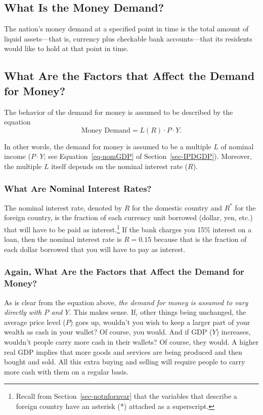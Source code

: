 \documentclass[
  letterpaper,
]{book}
\theoremstyle{plain}
\theoremstyle{remark}
\begin{document}
\subsection{What Is the Money Demand?}\label{sec-mdemand}

The nation's money demand  at a specified point
in time is the total amount of liquid assets---that is, currency plus
checkable bank accounts---that its residents would like to hold at that
point in time.

\subsection{What Are the Factors that Affect the Demand for
Money?}\label{sec-mdemanddet}

The behavior of the demand for money is assumed to be described by the
equation \[
\text{Money Demand}=L(R)\cdot P\cdot Y.
\]

In other words, the demand for money is assumed to be a multiple \(L\)
of nominal income (\(P\cdot Y\); see Equation~\ref{eq-nomGDP} of
Section~\ref{sec-IPDGDP}). Moreover, the multiple \(L\) itself depends
on the nominal interest rate (\(R\)).

\subsubsection{What Are Nominal Interest Rates?}\label{sec-nomint}

The nominal interest rate, denoted by \(R\) for the domestic country and
\(R^*\) for the foreign country, is the fraction of each currency unit
borrowed (dollar, yen, etc.) that will have to be paid as
interest.\footnote{Recall from Section~\ref{sec-notnfornvar} that the
  variables that describe a foreign country have an asterisk (*)
  attached as a superscript.} If the bank charges you 15\% interest on a
loan, then the nominal interest rate is \(R=0.15\) because that is the
fraction of each dollar borrowed that you will have to pay as interest.

\subsubsection{Again, What Are the Factors that Affect the Demand for
Money?}\label{sec-mdemanddet2}

As is clear from the equation above, \emph{the demand for money is
assumed to vary directly with \(P\) and \(Y\)}. This makes sense. If,
other things being unchanged, the average price level (\(P\)) goes up,
wouldn't you wish to keep a larger part of your wealth as cash in your
wallet? Of course, you would. And if GDP (\(Y\)) increases, wouldn't
people carry more cash in their wallets? Of course, they would. A higher
real GDP implies that more goods and services are being produced and
then bought and sold. All this extra buying and selling will require
people to carry more cash with them on a regular basis.
\end{document}

